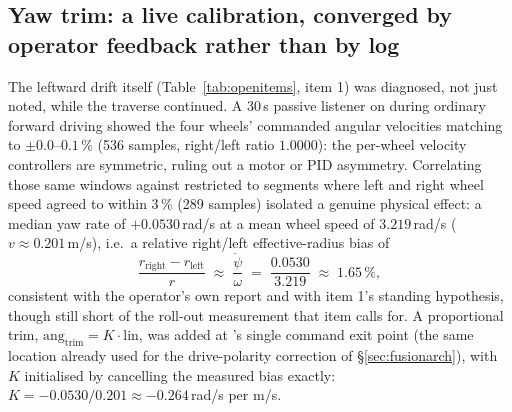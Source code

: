 \subsection{Yaw trim: a live calibration, converged by operator feedback rather than by log}
\label{sec:yawtrim}
The leftward drift itself (Table~\ref{tab:openitems}, item 1) was
diagnosed, not just noted, while the traverse continued. A 30\,s passive
listener on  during ordinary forward driving
showed the four wheels' commanded angular velocities matching to
$\pm 0.0$--$0.1\,\%$ (536 samples, right/left ratio $1.0000$): the per-wheel
velocity controllers are symmetric, ruling out a motor or PID asymmetry.
Correlating those same windows against  restricted to
segments where left and right wheel speed agreed to within 3\,\% (289
samples) isolated a genuine physical effect: a median yaw rate of
$+0.0530$\,rad/s at a mean wheel speed of $3.219$\,rad/s
($v \approx 0.201$\,m/s), i.e.\ a relative right/left effective-radius
bias of
\begin{equation}
\frac{r_{\text{right}}-r_{\text{left}}}{r} \;\approx\; \frac{\dot\psi}{\omega} \;=\; \frac{0.0530}{3.219} \;\approx\; 1.65\,\%,
\end{equation}
consistent with the operator's own report and with item 1's standing
hypothesis, though still short of the roll-out measurement that item calls
for. A proportional trim, $\text{ang}_{\text{trim}} = K \cdot \text{lin}$,
was added at 's single command exit point (the same location
already used for the drive-polarity correction of \S\ref{sec:fusionarch}),
with $K$ initialised by cancelling the measured bias exactly:
$K = -0.0530/0.201 \approx -0.264$\,rad/s per m/s.

